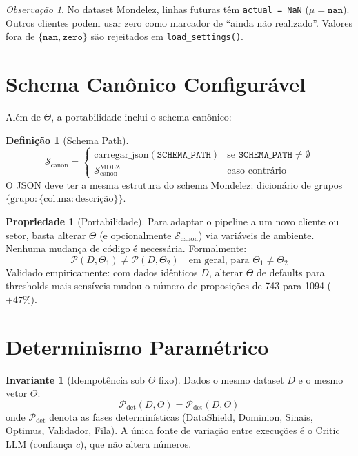 \documentclass[a4paper, 12pt]{report}
\theoremstyle{definition}
\newtheorem{definicao}{Defini\c{c}\~ao}[chapter]
\newtheorem{invariante}{Invariante}[chapter]
\newtheorem{propriedade}{Propriedade}[chapter]
\theoremstyle{remark}
\newtheorem{observacao}{Observa\c{c}\~ao}[chapter]
\begin{document}
\begin{observacao}
  No dataset Mondelez, linhas futuras t\^em \texttt{actual = NaN}
  ($\mu = \texttt{nan}$). Outros clientes podem usar zero como
  marcador de ``ainda n\~ao realizado''. Valores fora de
  $\{\texttt{nan}, \texttt{zero}\}$ s\~ao rejeitados em
  \texttt{load\_settings()}.
\end{observacao}


\section{Schema Can\^onico Configur\'avel}

Al\'em de $\Theta$, a portabilidade inclui o schema can\^onico:

\begin{definicao}[Schema Path]
  \[
    \mathcal{S}_{\text{canon}} = \begin{cases}
      \text{carregar\_json}(\texttt{SCHEMA\_PATH}) &
        \text{se } \texttt{SCHEMA\_PATH} \neq \emptyset \\
      \mathcal{S}_{\text{canon}}^{\text{MDLZ}} &
        \text{caso contr\'ario}
    \end{cases}
  \]
  O JSON deve ter a mesma estrutura do schema Mondelez: dicion\'ario
  de grupos $\{\text{grupo}: \{\text{coluna}: \text{descri\c{c}\~ao}\}\}$.
\end{definicao}

\begin{propriedade}[Portabilidade]
  Para adaptar o pipeline a um novo cliente ou setor, basta alterar
  $\Theta$ (e opcionalmente $\mathcal{S}_{\text{canon}}$) via
  vari\'aveis de ambiente. Nenhuma mudan\c{c}a de c\'odigo \'e necess\'aria.
  Formalmente:
  \[
    \mathcal{P}(D, \Theta_1) \neq \mathcal{P}(D, \Theta_2)
    \quad \text{em geral, para } \Theta_1 \neq \Theta_2
  \]
  Validado empiricamente: com dados id\^enticos $D$, alterar $\Theta$
  de defaults para thresholds mais sens\'iveis mudou o n\'umero de
  proposi\c{c}\~oes de 743 para 1094 ($+47\%$).
\end{propriedade}


\section{Determinismo Param\'etrico}

\begin{invariante}[Idempot\^encia sob $\Theta$ fixo]
  Dados o mesmo dataset $D$ e o mesmo vetor $\Theta$:
  \[
    \mathcal{P}_{\text{det}}(D, \Theta) = \mathcal{P}_{\text{det}}(D, \Theta)
  \]
  onde $\mathcal{P}_{\text{det}}$ denota as fases determin\'isticas
  (DataShield, Dominion, Sinais, Optimus, Validador, Fila).
  A \'unica fonte de varia\c{c}\~ao entre execu\c{c}\~oes \'e o Critic LLM
  (confian\c{c}a $c$), que n\~ao altera n\'umeros.
\end{invariante}
\end{document}
